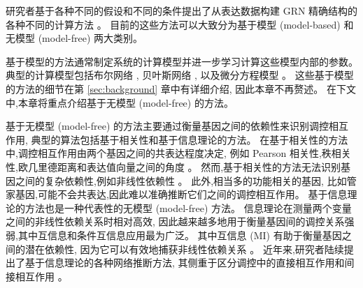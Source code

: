 
研究者基于各种不同的假设和不同的条件提出了从表达数据构建 GRN 精确结构的各种不同的计算方法 。
目前的这些方法可以大致分为基于模型 (model-based) 和无模型 (model-free) 两大类别。

基于模型的方法通常制定系统的计算模型并进一步学习计算这些模型内部的参数。
典型的计算模型包括布尔网络 ,
贝叶斯网络 ,
以及微分方程模型 。
这些基于模型的方法的细节在第 \ref{sec:background} 章中有详细介绍, 因此本章不再赘述。
在下文中,本章将重点介绍基于无模型 (model-free) 的方法。

基于无模型 (model-free) 的方法主要通过衡量基因之间的依赖性来识别调控相互作用,
典型的算法包括基于相关性和基于信息理论的方法。
在基于相关性的方法中,调控相互作用由两个基因之间的共表达程度决定,
例如 Pearson 相关性,秩相关性,欧几里德距离和表达值向量之间的角度 。
然而,基于相关性的方法无法识别基因之间的复杂依赖性,例如非线性依赖性 。
此外,相当多的功能相关的基因, 比如管家基因,可能不会共表达,因此难以准确推断它们之间的调控相互作用。
基于信息理论的方法也是一种代表性的无模型 (model-free) 方法。
信息理论在测量两个变量之间的非线性依赖关系时相对高效, 
因此越来越多地用于衡量基因间的调控关系强弱,其中互信息和条件互信息应用最为广泛。
其中互信息 (MI) 有助于衡量基因之间的潜在依赖性,
因为它可以有效地捕获非线性依赖关系 。
近年来,研究者陆续提出了基于信息理论的各种网络推断方法,
其侧重于区分调控中的直接相互作用和间接相互作用 。

